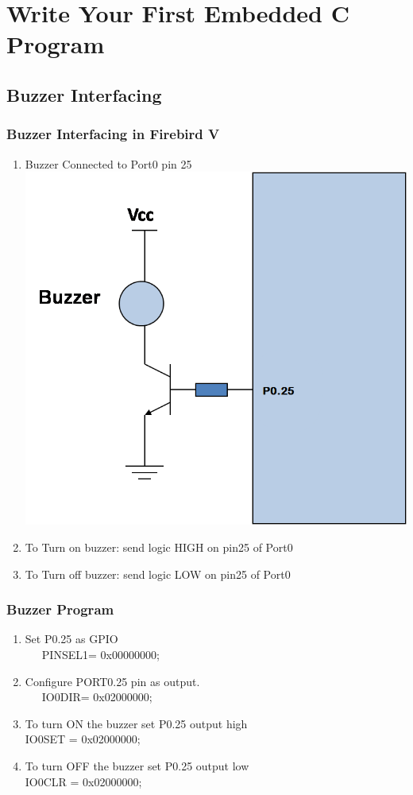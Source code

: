 \documentclass[10pt,red]{beamer}
\begin{document}
\section{Write Your First Embedded C Program}
\subsection{Buzzer Interfacing}
\begin{frame}
	\frametitle{Buzzer Interfacing in Firebird V}	\pause
		\begin{enumerate}
			\item<+-|alert@+> Buzzer Connected to Port0 pin 25 	\pause\\[10pt]
				\hspace{3cm}\includegraphics[width=0.5\linewidth]{buzzer}	\pause\\[10pt]
			\item<+-|alert@+>  To Turn on buzzer: \pause send logic HIGH on pin25 of Port0 \pause\\[10pt]
			\item<+-|alert@+>  To Turn off buzzer: \pause send logic LOW on pin25 of Port0
		\end{enumerate}
\end{frame}
\begin{frame}
	\frametitle{Buzzer Program}	\pause
		\begin{enumerate}
			\item<+-|alert@+> Set P0.25 as GPIO\pause\\[10pt]
			\ \ \ PINSEL1= 0x00000000; \pause\\[10pt]
			\item<+-|alert@+> Configure PORT0.25 pin as output.\pause\\[10pt]
				\ \ \ IO0DIR= 0x02000000;  \pause\\[10pt]
 			\item<+-|alert@+> To turn ON the buzzer set P0.25 output high\pause\\[10pt]
			 IO0SET = 0x02000000;\pause\\[10pt]
			\item<+-|alert@+> To turn OFF the buzzer set P0.25 output low\pause\\[10pt]
			 IO0CLR = 0x02000000;\pause\\[10pt]
		\end{enumerate}
\end{frame}
\end{document}
